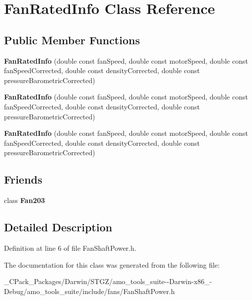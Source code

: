 \hypertarget{class_fan_rated_info}{}\section{Fan\+Rated\+Info Class Reference}
\label{class_fan_rated_info}
\subsection*{Public Member Functions}
\begin{DoxyCompactItemize}
\item 
\mbox{\label{class_fan_rated_info_aa76c95537bd1a0cd0159a8d45df76f18}} 
{\bfseries Fan\+Rated\+Info} (double const fan\+Speed, double const motor\+Speed, double const fan\+Speed\+Corrected, double const density\+Corrected, double const pressure\+Barometric\+Corrected)
\item 
\mbox{\label{class_fan_rated_info_aa76c95537bd1a0cd0159a8d45df76f18}} 
{\bfseries Fan\+Rated\+Info} (double const fan\+Speed, double const motor\+Speed, double const fan\+Speed\+Corrected, double const density\+Corrected, double const pressure\+Barometric\+Corrected)
\item 
\mbox{\label{class_fan_rated_info_aa76c95537bd1a0cd0159a8d45df76f18}} 
{\bfseries Fan\+Rated\+Info} (double const fan\+Speed, double const motor\+Speed, double const fan\+Speed\+Corrected, double const density\+Corrected, double const pressure\+Barometric\+Corrected)
\end{DoxyCompactItemize}
\subsection*{Friends}
\begin{DoxyCompactItemize}
\item 
\mbox{\label{class_fan_rated_info_ad537df0087a4a6f474dc9d50579cc33d}} 
class {\bfseries Fan203}
\end{DoxyCompactItemize}


\subsection{Detailed Description}


Definition at line 6 of file Fan\+Shaft\+Power.\+h.



The documentation for this class was generated from the following file\+:\begin{DoxyCompactItemize}
\item 
\+\_\+\+C\+Pack\+\_\+\+Packages/\+Darwin/\+S\+T\+G\+Z/amo\+\_\+tools\+\_\+suite-\/-\/\+Darwin-\/x86\+\_-\/\+Debug/amo\+\_\+tools\+\_\+suite/include/fans/Fan\+Shaft\+Power.\+h\end{DoxyCompactItemize}
